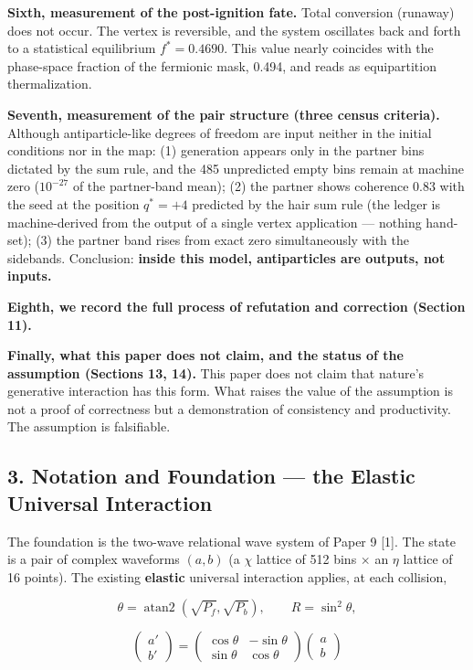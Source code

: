 \documentclass[
  a4paper,
]{article}
\begin{document}
\textbf{Sixth, measurement of the post-ignition fate.} Total conversion
(runaway) does not occur. The vertex is reversible, and the system
oscillates back and forth to a statistical equilibrium \(f^* = 0.4690\).
This value nearly coincides with the phase-space fraction of the
fermionic mask, 0.494, and reads as equipartition thermalization.

\textbf{Seventh, measurement of the pair structure (three census
criteria).} Although antiparticle-like degrees of freedom are input
neither in the initial conditions nor in the map: (1) generation appears
only in the partner bins dictated by the sum rule, and the 485
unpredicted empty bins remain at machine zero (\(10^{-27}\) of the
partner-band mean); (2) the partner shows coherence 0.83 with the seed
at the position \(q^*=+4\) predicted by the hair sum rule (the ledger is
machine-derived from the output of a single vertex application ---
nothing hand-set); (3) the partner band rises from exact zero
simultaneously with the sidebands. Conclusion: \textbf{inside this
model, antiparticles are outputs, not inputs.}

\textbf{Eighth, we record the full process of refutation and correction
(Section 11).}

\textbf{Finally, what this paper does not claim, and the status of the
assumption (Sections 13, 14).} This paper does not claim that nature's
generative interaction has this form. What raises the value of the
assumption is not a proof of correctness but a demonstration of
consistency and productivity. The assumption is falsifiable.

\subsection{3. Notation and Foundation --- the Elastic Universal
Interaction}\label{notation-and-foundation-the-elastic-universal-interaction}

The foundation is the two-wave relational wave system of Paper 9
{[}1{]}. The state is a pair of complex waveforms \((a,b)\) (a \(\chi\)
lattice of 512 bins \(\times\) an \(\eta\) lattice of 16 points). The
existing \textbf{elastic} universal interaction applies, at each
collision,

\[\theta = \operatorname{atan2}(\sqrt{P_f}, \sqrt{P_b}), \qquad R = \sin^2\theta,\]

\[\begin{pmatrix} a' \\ b' \end{pmatrix} = \begin{pmatrix} \cos\theta & -\sin\theta \\ \sin\theta & \cos\theta \end{pmatrix}\begin{pmatrix} a \\ b \end{pmatrix}\]
\end{document}
